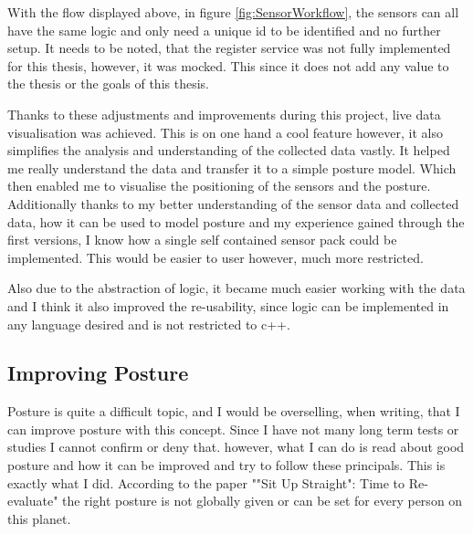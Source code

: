With the flow displayed above, in figure \ref{fig:SensorWorkflow}, the sensors can all have the same logic and only need  a unique id to be identified and no further setup. It needs to be noted, that the register service was not fully implemented for this thesis, however, it was mocked. This since it does not add any value to the thesis or the goals of this thesis.

Thanks to these adjustments and improvements during this project, live data visualisation was achieved. This is on one hand a cool feature however, it also simplifies the analysis and understanding of the collected data vastly. It helped me really understand the data and transfer it to a simple posture model. Which then enabled me to visualise the positioning of the sensors and the posture. Additionally thanks to my better understanding of the sensor data and collected data, how it can be used to model posture and my experience gained through the first versions, I know how a single self contained sensor pack could be implemented. This would be easier to user however, much more restricted. 

Also due to the abstraction of logic, it became much easier working with the data and I think it also improved the re-usability, since logic can be implemented in any language desired and is not restricted to c++.

\subsection{Improving Posture}

Posture is quite a difficult topic, and I would be overselling, when writing, that I can improve posture with this concept. Since I have not many long term tests or studies I cannot confirm or deny that. however, what I can do is read about good posture and how it can be improved and try to follow these principals. This is exactly what I did. According to the paper ""Sit Up Straight": Time to Re-evaluate" \cite{SitUpSt77:online} the right posture is not globally given or can be set for every person on this planet. 

